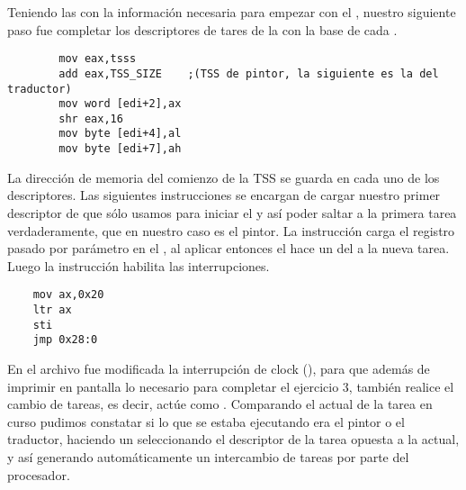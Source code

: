 	Teniendo las  con la información necesaria para empezar con el , nuestro siguiente paso fue completar los 
descriptores de tares de la  con la base de cada .

\begin{verbatim}
		mov eax,tsss 
		add eax,TSS_SIZE	;(TSS de pintor, la siguiente es la del traductor) 
		mov word [edi+2],ax		
		shr eax,16 
		mov byte [edi+4],al 
		mov byte [edi+7],ah
\end{verbatim}

La dirección de memoria del comienzo de la TSS se guarda en cada uno de los descriptores. Las siguientes instrucciones se encargan de cargar nuestro 
primer descriptor de  que sólo usamos para iniciar el  y así poder saltar a la primera tarea verdaderamente, que en 
nuestro caso es el pintor. La instrucción  carga el registro pasado por parámetro en el , al aplicar entonces el 
 hace un  del  a la nueva tarea. Luego la instrucción  habilita las interrupciones. 

\begin{verbatim}	
	mov ax,0x20      	
	ltr ax 
	sti 
	jmp 0x28:0 
\end{verbatim}
	
En el archivo  fue modificada la interrupción de clock (), para que además de imprimir en pantalla lo necesario para completar 
el ejercicio 3, también realice el cambio de tareas, es decir, actúe como . Comparando el  actual de la tarea en curso pudimos 
constatar si lo que se estaba ejecutando era el pintor o el traductor, haciendo un  seleccionando el descriptor de la tarea opuesta a la 
actual, y así generando automáticamente un intercambio de tareas por parte del procesador.

